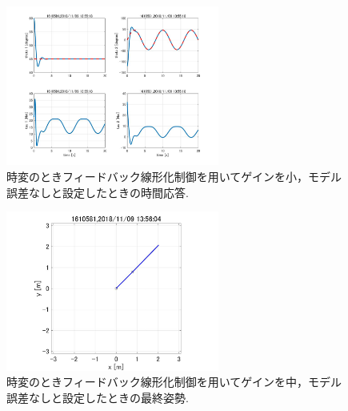 \documentclass[twocolumn, 10pt,a4j]{jsarticle}
\begin{document}
    \begin{figure}[H]
      \begin{center}
        \includegraphics[width=7cm]{../img/img/kansetu_FB_zihen_small_no_model_gosa_zikan_auto.jpg}
        \caption{時変のときフィードバック線形化制御を用いてゲインを小，モデル誤差なしと設定したときの時間応答.}
      \end{center}
    \end{figure}
    \begin{figure}[H]
      \begin{center}
        \includegraphics[width=7cm]{../img/img/kansetu_FB_zihen_chu_no_model_gosa_saisyu_sisei.jpg}
        \caption{時変のときフィードバック線形化制御を用いてゲインを中，モデル誤差なしと設定したときの最終姿勢.}
      \end{center}
    \end{figure}
\end{document}
